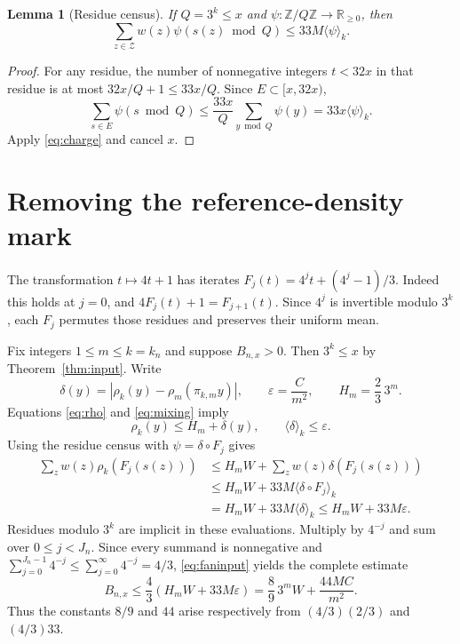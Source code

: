 \documentclass[11pt]{article}
\newtheorem{lemma}[theorem]{Lemma}
\newcommand{\R}{\mathbb R}
\begin{document}
\begin{lemma}[Residue census]\label{lem:census}
If $Q=3^k\le x$ and $\psi:\mathbb Z/Q\mathbb Z\to\R_{\ge0}$, then
\begin{equation}\label{eq:census}
 \sum_{z\in\mathcal Z}w(z)\psi(s(z)\bmod Q)\le33M\langle\psi\rangle_k.
\end{equation}
\end{lemma}
\begin{proof}
For any residue, the number of nonnegative integers $t<32x$ in that
residue is at most $32x/Q+1\le33x/Q$. Since $E\subset[x,32x)$,
\[
 \sum_{s\in E}\psi(s\bmod Q)
 \le\frac{33x}{Q}\sum_{y\bmod Q}\psi(y)=33x\langle\psi\rangle_k.
\]
Apply \eqref{eq:charge} and cancel $x$.
\end{proof}

\section{Removing the reference-density mark}
The transformation $t\mapsto4t+1$ has iterates
$F_j(t)=4^jt+(4^j-1)/3$. Indeed this holds at $j=0$, and
$4F_j(t)+1=F_{j+1}(t)$. Since $4^j$ is invertible modulo $3^k$,
each $F_j$ permutes those residues and preserves their uniform mean.

Fix integers $1\le m\le k=k_n$ and suppose $B_{n,x}>0$.
Then $3^k\le x$ by Theorem~\ref{thm:input}. Write
\[
 \delta(y)=|\rho_k(y)-\rho_m(\pi_{k,m}y)|,\qquad
 \varepsilon=\frac{C}{m^2},\qquad H_m=\frac23\,3^m.
\]
Equations \eqref{eq:rho} and \eqref{eq:mixing} imply
\[
 \rho_k(y)\le H_m+\delta(y),\qquad
 \langle\delta\rangle_k\le\varepsilon.
\]
Using the residue census with $\psi=\delta\circ F_j$ gives
\[
 \begin{split}
 \sum_z w(z)\rho_k(F_j(s(z)))
 &\le H_m W+\sum_z w(z)\delta(F_j(s(z)))\\
 &\le H_mW+33M\langle\delta\circ F_j\rangle_k\\
 &=H_mW+33M\langle\delta\rangle_k
 \le H_mW+33M\varepsilon.
 \end{split}
\]
Residues modulo $3^k$ are implicit in these evaluations. Multiply by
$4^{-j}$ and sum over $0\le j<J_n$. Since every summand is nonnegative and
$\sum_{j=0}^{J_n-1}4^{-j}\le\sum_{j=0}^\infty4^{-j}=4/3$,
\eqref{eq:faninput} yields the complete estimate
\begin{equation}\label{eq:unmark}
 B_{n,x}\le\frac43(H_mW+33M\varepsilon)
 =\frac89\,3^m W+\frac{44MC}{m^2}.
\end{equation}
Thus the constants $8/9$ and $44$ arise respectively from
$(4/3)(2/3)$ and $(4/3)33$.
\end{document}
